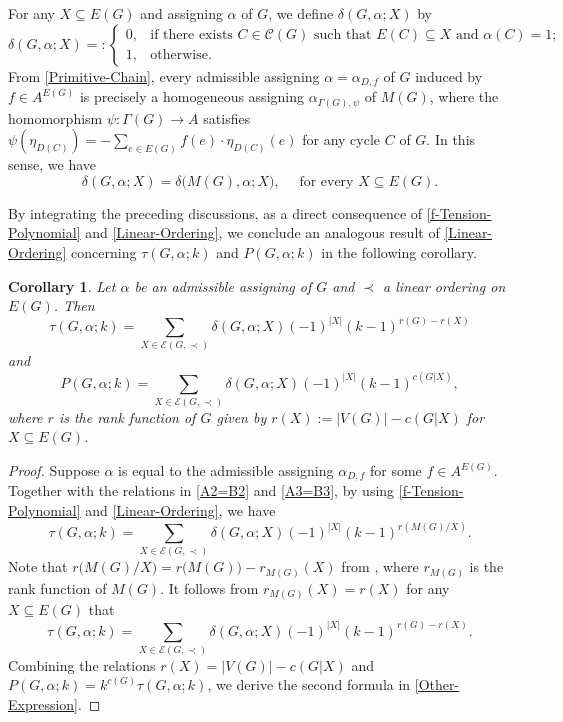 \documentclass[12pt]{article}%
\numberwithin{equation}{section}
\newtheorem{corollary}[corollary]{Corollary}
\begin{document}
For any $X\subseteq E(G)$ and assigning $\alpha$ of $G$, we define $\delta(G,\alpha;X)$  by
\[
\delta(G,\alpha;X)=:
\begin{cases}
0,&\text{if there exists $C\in\mathcal{C}(G)$ such that $E(C)\subseteq X$ and $\alpha(C)=1$};\\
1,&\text{otherwise}.
\end{cases}
\]  
From \eqref{Primitive-Chain}, every admissible assigning $\alpha=\alpha_{D,f}$ of $G$ induced by $f\in A^{E(G)}$ is precisely a homogeneous assigning $\alpha_{\Gamma(G),\psi}$ of $M(G)$, where the homomorphism $\psi:\Gamma(G)\to A$ satisfies $\psi(\eta_{D(C)})=-\sum_{e\in E(G)}f(e)\cdot\eta_{D(C)}(e) $ for any cycle $C$ of $G$. In this sense, we have
\begin{equation}\label{A3=B3}
\delta(G,\alpha;X)=\delta\big(M(G),\alpha;X\big),\quad\text{ for every }X\subseteq E(G).
\end{equation}

By integrating the preceding discussions, as a direct consequence of \autoref{f-Tension-Polynomial} and \autoref{Linear-Ordering}, we conclude an analogous result of \autoref{Linear-Ordering} concerning $\tau(G,\alpha;k)$ and $P(G,\alpha;k)$ in the following corollary. 

\begin{corollary}\label{Other-Expression}
Let $\alpha$ be an admissible assigning of  $G$ and $\prec$ a linear ordering on $E(G)$. Then
\[
\tau(G,\alpha;k)=\sum_{X\in \mathcal{E}(G,\prec)}\delta(G,\alpha;X)(-1)^{|X|}(k-1)^{r(G)-r(X)}
\]
and
\[
P(G,\alpha;k)=\sum_{X\in \mathcal{E}(G,\prec)}\delta(G,\alpha;X)(-1)^{|X|}(k-1)^{c(G|X)},
\]
where $r$ is the rank function of $G$ given by $r(X):=|V(G)|-c(G|X)$ for $X\subseteq E(G)$.
\end{corollary}
\begin{proof}
Suppose $\alpha$ is equal to the admissible assigning $\alpha_{D,f}$ for some $f\in A^{E(G)}$. Together with the relations in \eqref{A2=B2} and \eqref{A3=B3}, by using \autoref{f-Tension-Polynomial} and \autoref{Linear-Ordering}, we have
\[
\tau(G,\alpha;k)=\sum_{X\in \mathcal{E}(G,\prec)}\delta(G,\alpha;X)(-1)^{|X|}(k-1)^{r(M(G)/X)}.
\]
Note that  $r\big(M(G)/X\big)=r\big(M(G)\big)-r_{M(G)}(X)$ from \cite[Proposition 3.1.6]{Oxley2011}, where $r_{M(G)}$ is the rank function of $M(G)$. It follows from
$r_{M(G)}(X)=r(X)$ for any $X\subseteq E(G)$ that 
\[
\tau(G,\alpha;k)=\sum_{X\in \mathcal{E}(G,\prec)}\delta(G,\alpha;X)(-1)^{|X|}(k-1)^{r(G)-r(X)}.
\]
Combining the relations $r(X)=|V(G)|-c(G|X)$ and $P(G,\alpha;k)=k^{c(G)}\tau(G,\alpha;k)$, we derive the second formula in \autoref{Other-Expression}. 
\end{proof}
\end{document}
